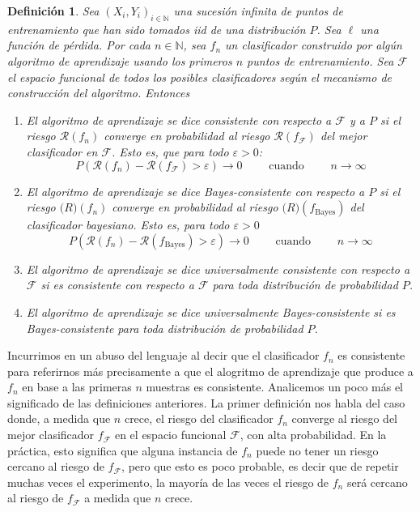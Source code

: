 \documentclass{report}
\newtheorem{dfn}{Definición}[section]
\begin{document}
\begin{dfn}
    Sea $(X_i,Y_i)_{i\in\mathbb{N}}$ una sucesión infinita de puntos de entrenamiento que han sido tomados iid de una distribución $P$.
    Sea $\ell$ una función de pérdida. Por cada $n\in \mathbb{N}$, sea $f_n$ un clasificador construido por algún algoritmo de aprendizaje
    usando los primeros $n$ puntos de entrenamiento. Sea $\mathcal{F}$ el espacio funcional de todos los posibles clasificadores según
    el mecanismo de construcción del algoritmo. Entonces
    \begin{enumerate}
    \item  El algoritmo de aprendizaje se dice \textnormal{consistente con respecto a $\mathcal{F}$ y a $P$} si el riesgo $\mathcal{R}(f_n)$
     converge en probabilidad al riesgo  $\mathcal{R}(f_{\mathcal{F}})$ del mejor clasificador en $\mathcal{F}$. Esto es,
     que para todo $\varepsilon>0$:
     \[
     P\left(\mathcal{R}(f_n)-\mathcal{R}(f_{\mathcal{F}})>\varepsilon\right) \rightarrow 0 \qquad \text{ cuando } \qquad n\rightarrow \infty
     \]
     \item  El algoritmo de aprendizaje se dice \textnormal{Bayes-consistente con respecto a $P$} si el riesgo $\mathcal(R)(f_n)$
     converge en probabilidad al riesgo  $\mathcal(R)(f_{\text{Bayes}})$ del clasificador bayesiano. Esto es, para todo $\varepsilon>0$
    \[
     P\left(\mathcal{R}(f_n)-\mathcal{R}(f_{\text{Bayes}})>\varepsilon\right) \rightarrow 0 \qquad \text{ cuando } \qquad n\rightarrow \infty
    \]
    \item  El algoritmo de aprendizaje se dice \textnormal{universalmente consistente con respecto a $\mathcal{F}$} si 
    es consistente con respecto a $\mathcal{F}$ para toda distribución de probabilidad $P$.
    \item  El algoritmo de aprendizaje se dice \textnormal{universalmente Bayes-consistente } si 
    es Bayes-consistente para toda distribución de probabilidad $P$.
    \end{enumerate}
    \label{def:consistencias}
\end{dfn}

Incurrimos en un abuso del lenguaje al decir que el clasificador $f_n$ es consistente para referirnos más precisamente a que
el alogritmo de aprendizaje que produce a $f_n$ en base a las primeras $n$ muestras es consistente. Analicemos un poco más el
significado de las definiciones anteriores. La primer definición nos habla del caso donde, a medida que $n$ crece, el riesgo
del clasificador $f_n$ converge al riesgo del mejor clasificador $f_{\mathcal{F}}$ en el espacio funcional $\mathcal{F}$, con alta probabilidad.
En la práctica, esto significa que alguna instancia de $f_n$ puede no tener un riesgo cercano al riesgo de $f_{\mathcal{F}}$, pero que esto es poco
probable, es decir que de repetir muchas veces el experimento, la mayoría de las veces el riesgo de $f_n$ será cercano al riesgo de $f_{\mathcal{F}}$
a medida que $n$ crece. \newline
\end{document}
